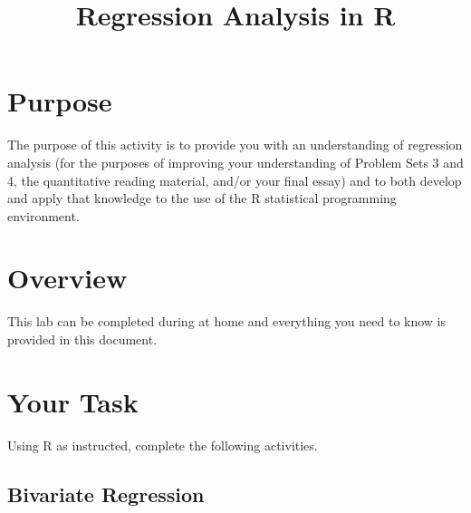 \documentclass[a4paper,12pt]{article}
\title{Regression Analysis in R}
\author{}
\date{}
\begin{document}
\vspace{-4em}

\maketitle

\vspace{-4em}

\section{Purpose}

The purpose of this activity is to provide you with an understanding of regression analysis (for the purposes of improving your understanding of Problem Sets 3 and 4, the quantitative reading material, and/or your final essay) and to both develop and apply that knowledge to the use of the R statistical programming environment.

\section{Overview}

This lab can be completed during at home and everything you need to know is provided in this document.

\section{Your Task}

Using R as instructed, complete the following activities.

\subsection{Bivariate Regression}
\end{document}
